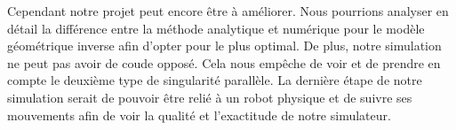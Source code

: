 \documentclass[a4paper, 11pt]{report}
\begin{document}
Cependant notre projet peut encore être à améliorer. Nous pourrions analyser en détail la différence entre la méthode analytique et numérique pour le modèle géométrique inverse afin d'opter pour le plus optimal. De plus, notre simulation ne peut pas avoir de coude opposé. Cela nous empêche de voir et de prendre en compte le deuxième type de singularité parallèle. La dernière étape de notre simulation serait de pouvoir être relié à un robot physique et de suivre ses mouvements afin de voir la qualité et l'exactitude de notre simulateur.
\newpage

\newpage
\nocite{*}
\printbibliography
\end{document}
